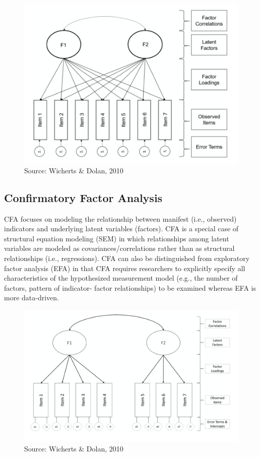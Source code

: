 \documentclass[
]{book}
\begin{document}
\begin{figure}
\includegraphics[width=0.8\linewidth]{expfactanal} \caption{Source: Wicherts & Dolan, 2010}\label{fig:factor}
\end{figure}

\hypertarget{confirmatory-factor-analysis}{%
\subsection{Confirmatory Factor Analysis}\label{confirmatory-factor-analysis}}

CFA focuses on modeling the relationship between manifest (i.e., observed) indicators and underlying latent variables (factors). CFA is a special case of structural equation modeling (SEM) in which relationships among latent variables are modeled as covariances/correlations rather than as structural relationships (i.e., regressions). CFA can also be distinguished from exploratory factor analysis (EFA) in that CFA requires researchers to explicitly specify all characteristics of the hypothesized measurement model (e.g., the number of factors, pattern of indicator- factor relationships) to be examined whereas EFA is more data-driven.

\begin{figure}
\includegraphics[width=0.8\linewidth]{confactor} \caption{Source: Wicherts & Dolan, 2010}\label{fig:cfa}
\end{figure}
\end{document}
